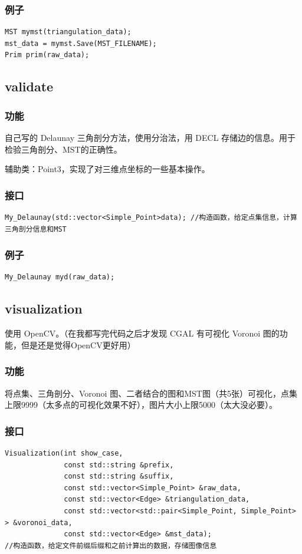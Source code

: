 \documentclass[a4paper]{article}
\begin{document}
\subsubsection{例子}
\begin{lstlisting}
MST mymst(triangulation_data);
mst_data = mymst.Save(MST_FILENAME);
Prim prim(raw_data);
\end{lstlisting}
\subsection{validate}
\subsubsection{功能}
自己写的 Delaunay 三角剖分方法，使用分治法，用 DECL 存储边的信息。用于检验三角剖分、MST的正确性。

辅助类：Point3，实现了对三维点坐标的一些基本操作。
\subsubsection{接口}
\begin{lstlisting}
My_Delaunay(std::vector<Simple_Point>data); //构造函数，给定点集信息，计算三角剖分信息和MST
\end{lstlisting}
\subsubsection{例子}
\begin{lstlisting}
My_Delaunay myd(raw_data);
\end{lstlisting}
\subsection{visualization}
使用 OpenCV。（在我都写完代码之后才发现 CGAL 有可视化 Voronoi 图的功能，但是还是觉得OpenCV更好用）
\subsubsection{功能}
将点集、三角剖分、Voronoi 图、二者结合的图和MST图（共5张）可视化，点集上限9999（太多点的可视化效果不好），图片大小上限5000（太大没必要）。
\subsubsection{接口}
\begin{lstlisting}
Visualization(int show_case,
              const std::string &prefix,
              const std::string &suffix,
              const std::vector<Simple_Point> &raw_data,
              const std::vector<Edge> &triangulation_data,
              const std::vector<std::pair<Simple_Point, Simple_Point> > &voronoi_data,
              const std::vector<Edge> &mst_data);
//构造函数，给定文件前缀后缀和之前计算出的数据，存储图像信息
\end{lstlisting}
\end{document}
